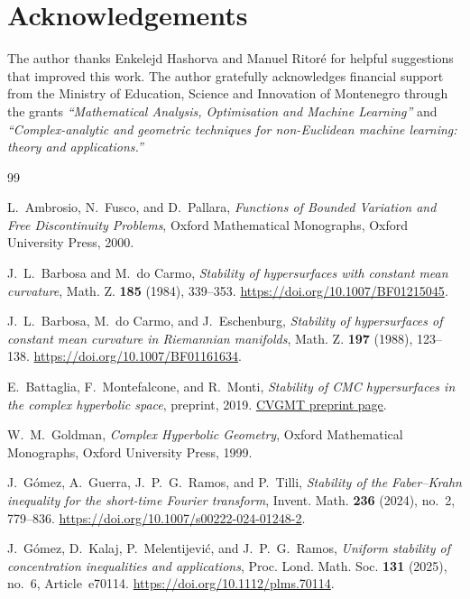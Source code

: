 \documentclass[11pt,reqno]{amsart}
\numberwithin{equation}{section}
\theoremstyle{definition}
\theoremstyle{remark}
\begin{document}
\section*{Acknowledgements}
The author thanks Enkelejd Hashorva and Manuel Ritor\'e for helpful
suggestions that improved this work.
The author gratefully acknowledges financial support from the Ministry
of Education, Science and Innovation of Montenegro through the grants
\emph{``Mathematical Analysis, Optimisation and Machine Learning''} and
\emph{``Complex-analytic and geometric techniques for non-Euclidean machine
learning: theory and applications.''}
\begin{thebibliography}{99}

L.~Ambrosio, N.~Fusco, and D.~Pallara,
\emph{Functions of Bounded Variation and Free Discontinuity Problems},
Oxford Mathematical Monographs,
Oxford University Press, 2000.

J.~L.~Barbosa and M.~do Carmo,
\emph{Stability of hypersurfaces with constant mean curvature},
Math. Z. \textbf{185} (1984), 339--353.
\url{https://doi.org/10.1007/BF01215045}.

J.~L.~Barbosa, M.~do Carmo, and J.~Eschenburg,
\emph{Stability of hypersurfaces of constant mean curvature in Riemannian
manifolds},
Math. Z. \textbf{197} (1988), 123--138.
\url{https://doi.org/10.1007/BF01161634}.

E.~Battaglia, F.~Montefalcone, and R.~Monti,
\emph{Stability of CMC hypersurfaces in the complex hyperbolic space},
preprint, 2019.
\href{https://cvgmt.sns.it/paper/4468/}{CVGMT preprint page}.

W.~M.~Goldman,
\emph{Complex Hyperbolic Geometry},
Oxford Mathematical Monographs,
Oxford University Press, 1999.

J.~G\'omez, A.~Guerra, J.~P.~G.~Ramos, and P.~Tilli,
\emph{Stability of the Faber--Krahn inequality for the short-time Fourier
transform},
Invent. Math. \textbf{236} (2024), no.~2, 779--836.
\url{https://doi.org/10.1007/s00222-024-01248-2}.

J.~G\'omez, D.~Kalaj, P.~Melentijevi\'c, and J.~P.~G.~Ramos,
\emph{Uniform stability of concentration inequalities and applications},
Proc. Lond. Math. Soc. \textbf{131} (2025), no.~6, Article~e70114.
\url{https://doi.org/10.1112/plms.70114}.


\end{thebibliography}
\end{document}
